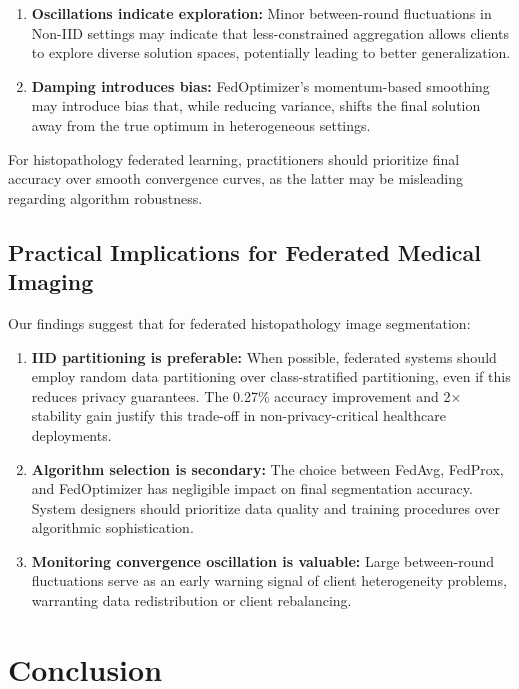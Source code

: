 \documentclass[conference]{IEEEtran}
\begin{document}
\begin{enumerate}
\item \textbf{Oscillations indicate exploration:} Minor between-round fluctuations in Non-IID settings may indicate that less-constrained aggregation allows clients to explore diverse solution spaces, potentially leading to better generalization.

\item \textbf{Damping introduces bias:} FedOptimizer's momentum-based smoothing may introduce bias that, while reducing variance, shifts the final solution away from the true optimum in heterogeneous settings.
\end{enumerate}

For histopathology federated learning, practitioners should prioritize final accuracy over smooth convergence curves, as the latter may be misleading regarding algorithm robustness.

\subsection{Practical Implications for Federated Medical Imaging}

Our findings suggest that for federated histopathology image segmentation:

\begin{enumerate}
\item \textbf{IID partitioning is preferable:} When possible, federated systems should employ random data partitioning over class-stratified partitioning, even if this reduces privacy guarantees. The 0.27\% accuracy improvement and 2× stability gain justify this trade-off in non-privacy-critical healthcare deployments.

\item \textbf{Algorithm selection is secondary:} The choice between FedAvg, FedProx, and FedOptimizer has negligible impact on final segmentation accuracy. System designers should prioritize data quality and training procedures over algorithmic sophistication.

\item \textbf{Monitoring convergence oscillation is valuable:} Large between-round fluctuations serve as an early warning signal of client heterogeneity problems, warranting data redistribution or client rebalancing.
\end{enumerate}

\section{Conclusion}
\end{document}
